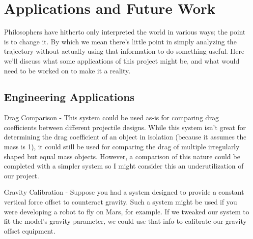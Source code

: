 \section{Applications and Future Work}

Philosophers have hitherto only interpreted the world in various ways; the point is to change it. By which we mean there's little point in simply analyzing the trajectory without actually using that information to do something useful. Here we'll discuss what some applications of this project might be, and what would need to be worked on to make it a reality.

\subsection{Engineering Applications}
Drag Comparison - This system could be used as-is for comparing drag coefficients between different projectile designs. While this system isn't great for determining the drag coefficient of an object in isolation (because it assumes the mass is 1), it could still be used for comparing the drag of multiple irregularly shaped but equal mass objects. However, a comparison of this nature could be completed with a simpler system so I might consider this an underutilization of our project. 

Gravity Calibration - Suppose you had a system designed to provide a constant vertical force offset to counteract gravity. Such a system might be used if you were developing a robot to fly on Mars, for example. If we tweaked our system to fit the model's gravity parameter, we could use that info to calibrate our gravity offset equipment. 

